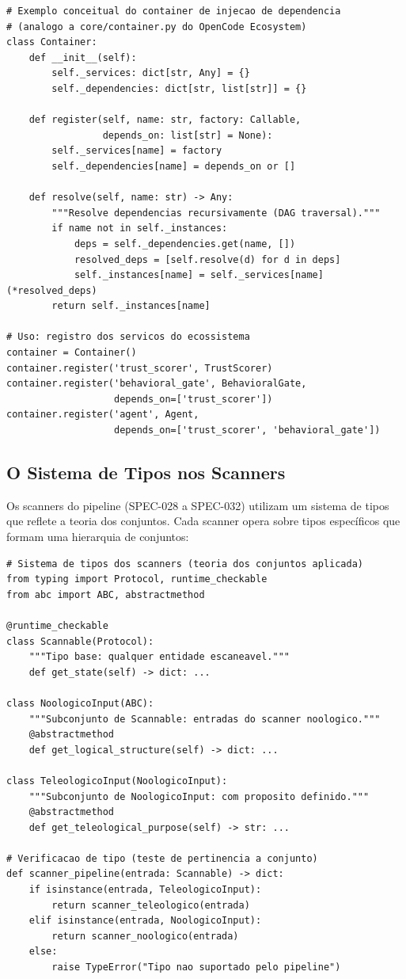 \begin{lstlisting}[style=pythonstyle]
# Exemplo conceitual do container de injecao de dependencia
# (analogo a core/container.py do OpenCode Ecosystem)
class Container:
    def __init__(self):
        self._services: dict[str, Any] = {}
        self._dependencies: dict[str, list[str]] = {}

    def register(self, name: str, factory: Callable,
                 depends_on: list[str] = None):
        self._services[name] = factory
        self._dependencies[name] = depends_on or []

    def resolve(self, name: str) -> Any:
        """Resolve dependencias recursivamente (DAG traversal)."""
        if name not in self._instances:
            deps = self._dependencies.get(name, [])
            resolved_deps = [self.resolve(d) for d in deps]
            self._instances[name] = self._services[name](*resolved_deps)
        return self._instances[name]

# Uso: registro dos servicos do ecossistema
container = Container()
container.register('trust_scorer', TrustScorer)
container.register('behavioral_gate', BehavioralGate,
                   depends_on=['trust_scorer'])
container.register('agent', Agent,
                   depends_on=['trust_scorer', 'behavioral_gate'])
\end{lstlisting}

\subsection{O Sistema de Tipos nos Scanners}

Os scanners do pipeline (SPEC-028 a SPEC-032) utilizam um sistema de tipos
que reflete a teoria dos conjuntos. Cada scanner opera sobre tipos
específicos que formam uma hierarquia de conjuntos:

\begin{lstlisting}[style=pythonstyle]
# Sistema de tipos dos scanners (teoria dos conjuntos aplicada)
from typing import Protocol, runtime_checkable
from abc import ABC, abstractmethod

@runtime_checkable
class Scannable(Protocol):
    """Tipo base: qualquer entidade escaneavel."""
    def get_state(self) -> dict: ...

class NoologicoInput(ABC):
    """Subconjunto de Scannable: entradas do scanner noologico."""
    @abstractmethod
    def get_logical_structure(self) -> dict: ...

class TeleologicoInput(NoologicoInput):
    """Subconjunto de NoologicoInput: com proposito definido."""
    @abstractmethod
    def get_teleological_purpose(self) -> str: ...

# Verificacao de tipo (teste de pertinencia a conjunto)
def scanner_pipeline(entrada: Scannable) -> dict:
    if isinstance(entrada, TeleologicoInput):
        return scanner_teleologico(entrada)
    elif isinstance(entrada, NoologicoInput):
        return scanner_noologico(entrada)
    else:
        raise TypeError("Tipo nao suportado pelo pipeline")
\end{lstlisting}

